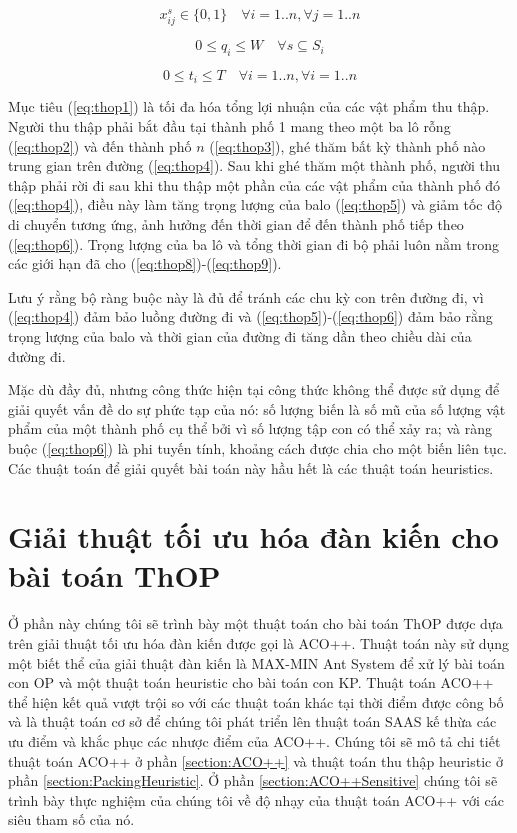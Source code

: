 \begin{equation}\label{eq:thop7}
    x_{i j}^s \in\{0,1\} \quad \forall i=1 .. n,\forall j=1 .. n
\end{equation}

\begin{equation}\label{eq:thop8}
    0 \leq q_i \leq W \quad \forall s \subseteq S_i
\end{equation}

\begin{equation}\label{eq:thop9}
    0 \leq t_i \leq T \quad \forall i=1 .. n, \forall i=1 .. n
\end{equation}

Mục tiêu (\ref{eq:thop1}) là tối đa hóa tổng lợi nhuận của các vật phẩm thu thập. Người thu thập phải bắt đầu tại thành phố 1 mang theo một ba lô rỗng (\ref{eq:thop2}) và đến thành phố $n$ (\ref{eq:thop3}), ghé thăm bất kỳ thành phố nào trung gian trên đường (\ref{eq:thop4}). Sau khi ghé thăm một thành phố, người thu thập phải rời đi sau khi thu thập một phần của các vật phẩm của thành phố đó (\ref{eq:thop4}), điều này làm tăng trọng lượng của balo (\ref{eq:thop5}) và giảm tốc độ di chuyển tương ứng, ảnh hưởng đến thời gian để đến thành phố tiếp theo (\ref{eq:thop6}). Trọng lượng của ba lô và tổng thời gian đi bộ phải luôn nằm trong các giới hạn đã cho (\ref{eq:thop8})-(\ref{eq:thop9}).

Lưu ý rằng bộ ràng buộc này là đủ để tránh các chu kỳ con trên đường đi, vì (\ref{eq:thop4}) đảm bảo luồng đường đi và (\ref{eq:thop5})-(\ref{eq:thop6}) đảm bảo rằng trọng lượng của balo và thời gian của đường đi tăng dần theo chiều dài của đường đi.

Mặc dù đầy đủ, nhưng công thức hiện tại công thức không thể được sử dụng để giải quyết vấn đề do sự phức tạp của nó: số lượng biến là số mũ của số lượng vật phẩm của một thành phố cụ thể bởi vì số lượng tập con có thể xảy ra; và ràng buộc (\ref{eq:thop6}) là phi tuyến tính, khoảng cách được chia cho một biến liên tục. Các thuật toán để giải quyết bài toán này hầu hết là các thuật toán heuristics.

\section{Giải thuật tối ưu hóa đàn kiến cho bài toán ThOP}\label{section:ACO}

Ở phần này chúng tôi sẽ trình bày một thuật toán cho bài toán ThOP được dựa trên giải thuật tối ưu hóa đàn kiến được gọi là ACO++. Thuật toán này sử dụng một biết thể của giải thuật đàn kiến là MAX-MIN Ant System \cite{STUTZLE2000889} để xử lý bài toán con OP và một thuật toán heuristic cho bài toán con KP. Thuật toán ACO++ thể hiện kết quả vượt trội so với các thuật toán khác tại thời điểm được công bố và là thuật toán cơ sở để chúng tôi phát triển lên thuật toán SAAS kế thừa các ưu điểm và khắc phục các nhược điểm của ACO++. Chúng tôi sẽ mô tả chi tiết thuật toán ACO++ ở phần \ref{section:ACO++} và thuật toán thu thập heuristic ở phần \ref{section:PackingHeuristic}. Ở phần \ref{section:ACO++Sensitive} chúng tôi sẽ trình bày thực nghiệm của chúng tôi về độ nhạy của thuật toán ACO++ với các siêu tham số của nó.

